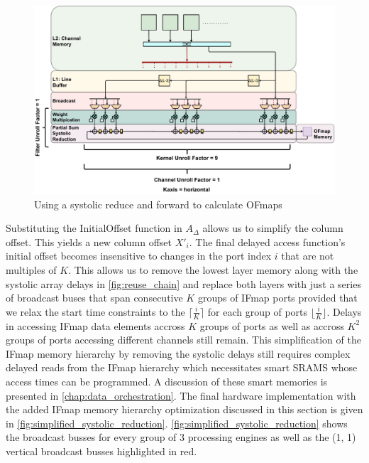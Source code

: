 \begin{figure}[]
    \centering
    \includegraphics[scale=0.36]{fig/hybrid3x3Gemm.pdf}
    \caption{Using a systolic reduce and forward to calculate OFmaps}
    \label{fig:simplified_systolic_reduction}
\end{figure}

Substituting the InitialOffset function in $A_\Delta$  allows us to simplify the
column offset. This yields a new column offset $X'_i$. The final delayed access
function's initial offset becomes insensitive to changes in the port index $i$
that are not multiples of $K$. This allows us to remove the lowest layer memory
along with the systolic array delays in \autoref{fig:reuse_chain} and replace
both layers with just a series of broadcast buses that span consecutive $K$
groups of IFmap ports provided that we relax the start time constraints to the
$\lceil \frac{i}{K} \rceil$ for each group of ports $\lfloor \frac{i}{K}
\rfloor$. Delays in accessing IFmap data elements accross $K$ groups of ports as
well as accross $K^2$ groups of ports accessing different channels still remain.
This simplification of the IFmap memory hierarchy by removing the systolic
delays still requires complex delayed reads from the IFmap hierarchy which
necessitates smart SRAMS whose access times can be programmed. A discussion of
these smart memories is presented in \autoref{chap:data_orchestration}. The
final hardware implementation with the added IFmap memory hierarchy optimization
discussed in this section is given in
\autoref{fig:simplified_systolic_reduction}.
\autoref{fig:simplified_systolic_reduction} shows the broadcast busses for every
group of 3 processing engines as well as the (1, 1) vertical broadcast busses
highlighted in red. 

